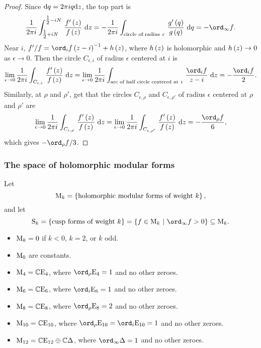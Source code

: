 \begin{proof}
Since $ \mathrm{d} q = 2\pi iq\mathrm{d} z $, the top part is
$$ \dfrac{1}{2\pi i}\intd{\tfrac{1}{2} + iN}{\tfrac{1}{2} - iN}{\dfrac{f'\br{z}}{f\br{z}}}{z} = -\dfrac{1}{2\pi i}\intd{\text{circle of radius} \ \epsilon}{}{\dfrac{g'\br{q}}{g\br{q}}}{q} = -\ord_\infty f. $$
Near $ i $, $ f' / f = \ord_i f\br{z - i}^{-1} + h\br{z} $, where $ h\br{z} $ is holomorphic and $ h\br{z} \to 0 $ as $ \epsilon \to 0 $. Then the circle $ C_{\epsilon, i} $ of radius $ \epsilon $ centered at $ i $ is
$$ \lim_{\epsilon \to 0} \dfrac{1}{2\pi i}\intd{C_{\epsilon, i}}{}{\dfrac{f'\br{z}}{f\br{z}}}{z} = \lim_{\epsilon \to 0} \dfrac{1}{2\pi i}\intd{\text{arc of half circle centered at} \ i}{}{\dfrac{\ord_i f}{z - i}}{z} = -\dfrac{\ord_i f}{2}. $$
Similarly, at $ \rho $ and $ \rho' $, get that the circles $ C_{\epsilon, \rho} $ and $ C_{\epsilon, \rho'} $ of radius $ \epsilon $ centered at $ \rho $ and $ \rho' $ are
$$ \lim_{\epsilon \to 0} \dfrac{1}{2\pi i}\intd{C_{\epsilon, \rho}}{}{\dfrac{f'\br{z}}{f\br{z}}}{z} = \lim_{\epsilon \to 0} \dfrac{1}{2\pi i}\intd{C_{\epsilon, \rho'}}{}{\dfrac{f'\br{z}}{f\br{z}}}{z} = -\dfrac{\ord_\rho f}{6}, $$
which gives $ -\ord_\rho f / 3 $.
\end{proof}

\pagebreak

\subsubsection{The space of holomorphic modular forms}

Let
$$ \M_k = \cbr{\text{holomorphic modular forms of weight} \ k}, $$
and let
$$ \S_k = \cbr{\text{cusp forms of weight} \ k} = \cbr{f \in \M_k \st \ord_\infty f > 0} \subseteq \M_k. $$

\begin{corollary}
\hfill
\begin{itemize}
\item $ \mathrm{M}_k = 0 $ if $ k < 0 $, $ k = 2 $, or $ k $ odd.
\item $ \mathrm{M}_0 $ are constants.
\item $ \mathrm{M}_4 = \mathbb{C}\mathrm{E}_4 $, where $ \ord_\rho \E_4 = 1 $ and no other zeroes.
\item $ \mathrm{M}_6 = \mathbb{C}\mathrm{E}_6 $, where $ \ord_i \E_6 = 1 $ and no other zeroes.
\item $ \mathrm{M}_8 = \mathbb{C}\mathrm{E}_8 $, where $ \ord_\rho \E_8 = 2 $ and no other zeroes.
\item $ \mathrm{M}_{10} = \mathbb{C}\mathrm{E}_{10} $, where $ \ord_\rho \E_{10} = \ord_i \E_{10} = 1 $ and no other zeroes.
\item $ \mathrm{M}_{12} = \mathbb{C}\mathrm{E}_{12} \oplus \mathbb{C}\Delta $, where $ \ord_\infty \Delta = 1 $ and no other zeroes.
\end{itemize}
\end{corollary}

